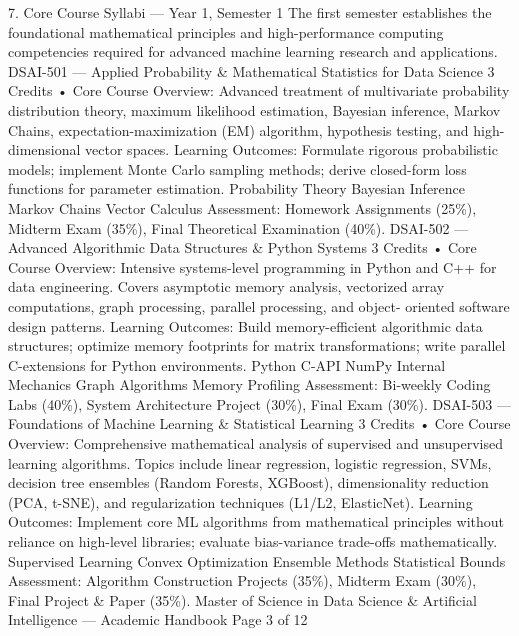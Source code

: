 \documentclass[12pt]{article}
\begin{document}
7. Core Course Syllabi — Year 1, Semester 1
The first semester establishes the foundational mathematical principles and high-performance computing
competencies required for advanced machine learning research and applications.
DSAI-501 — Applied Probability \& Mathematical Statistics for Data Science
3 Credits • Core
Course Overview: Advanced treatment of multivariate probability distribution theory, maximum likelihood
estimation, Bayesian inference, Markov Chains, expectation-maximization (EM) algorithm, hypothesis testing,
and high-dimensional vector spaces.
Learning Outcomes: Formulate rigorous probabilistic models; implement Monte Carlo sampling methods; derive
closed-form loss functions for parameter estimation.
Probability Theory Bayesian Inference Markov Chains Vector Calculus
Assessment: Homework Assignments (25\%), Midterm Exam (35\%), Final Theoretical Examination (40\%).
DSAI-502 — Advanced Algorithmic Data Structures \& Python Systems
3 Credits • Core
Course Overview: Intensive systems-level programming in Python and C++ for data engineering. Covers
asymptotic memory analysis, vectorized array computations, graph processing, parallel processing, and object-
oriented software design patterns.
Learning Outcomes: Build memory-efficient algorithmic data structures; optimize memory footprints for matrix
transformations; write parallel C-extensions for Python environments.
Python C-API NumPy Internal Mechanics Graph Algorithms Memory Profiling
Assessment: Bi-weekly Coding Labs (40\%), System Architecture Project (30\%), Final Exam (30\%).
DSAI-503 — Foundations of Machine Learning \& Statistical Learning
3 Credits • Core
Course Overview: Comprehensive mathematical analysis of supervised and unsupervised learning algorithms.
Topics include linear regression, logistic regression, SVMs, decision tree ensembles (Random Forests, XGBoost),
dimensionality reduction (PCA, t-SNE), and regularization techniques (L1/L2, ElasticNet).
Learning Outcomes: Implement core ML algorithms from mathematical principles without reliance on high-level
libraries; evaluate bias-variance trade-offs mathematically.
Supervised Learning Convex Optimization Ensemble Methods Statistical Bounds
Assessment: Algorithm Construction Projects (35\%), Midterm Exam (30\%), Final Project \& Paper (35\%).
Master of Science in Data Science \& Artificial Intelligence — Academic Handbook
Page 3 of 12
\end{document}

